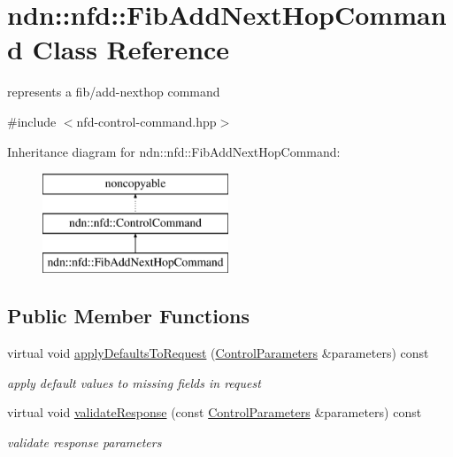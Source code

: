 \hypertarget{classndn_1_1nfd_1_1FibAddNextHopCommand}{}\section{ndn\+:\+:nfd\+:\+:Fib\+Add\+Next\+Hop\+Command Class Reference}
\label{classndn_1_1nfd_1_1FibAddNextHopCommand}


represents a fib/add-\/nexthop command  




{\ttfamily \#include $<$nfd-\/control-\/command.\+hpp$>$}

Inheritance diagram for ndn\+:\+:nfd\+:\+:Fib\+Add\+Next\+Hop\+Command\+:\begin{figure}[H]
\begin{center}
\leavevmode
\includegraphics[height=3.000000cm]{classndn_1_1nfd_1_1FibAddNextHopCommand}
\end{center}
\end{figure}
\subsection*{Public Member Functions}
\begin{DoxyCompactItemize}
\item 
virtual void \hyperlink{classndn_1_1nfd_1_1FibAddNextHopCommand_a434b683b5e82b2d9f0d12d99b1bf8b57}{apply\+Defaults\+To\+Request} (\hyperlink{classndn_1_1nfd_1_1ControlParameters}{Control\+Parameters} \&parameters) const\hypertarget{classndn_1_1nfd_1_1FibAddNextHopCommand_a434b683b5e82b2d9f0d12d99b1bf8b57}{}\label{classndn_1_1nfd_1_1FibAddNextHopCommand_a434b683b5e82b2d9f0d12d99b1bf8b57}

\begin{DoxyCompactList}\small\item\em apply default values to missing fields in request \end{DoxyCompactList}\item 
virtual void \hyperlink{classndn_1_1nfd_1_1FibAddNextHopCommand_abc246a14883158916698fba84edaf222}{validate\+Response} (const \hyperlink{classndn_1_1nfd_1_1ControlParameters}{Control\+Parameters} \&parameters) const
\begin{DoxyCompactList}\small\item\em validate response parameters \end{DoxyCompactList}\end{DoxyCompactItemize}

